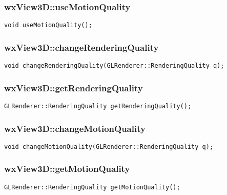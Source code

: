 \documentclass[12pt]{article}
\begin{document}
\subsubsection*{wxView3D::useMotionQuality}
\vspace{-0.65cm}
\hrulefill
{}
\begin{flushleft}
\texttt{void useMotionQuality();}
\end{flushleft}



\subsubsection*{wxView3D::changeRenderingQuality}
\vspace{-0.65cm}
\hrulefill
{}
\begin{flushleft}
\texttt{void changeRenderingQuality(GLRenderer::RenderingQuality q);}
\end{flushleft}



\subsubsection*{wxView3D::getRenderingQuality}
\vspace{-0.65cm}
\hrulefill
{}
\begin{flushleft}
\texttt{GLRenderer::RenderingQuality getRenderingQuality();}
\end{flushleft}



\subsubsection*{wxView3D::changeMotionQuality}
\vspace{-0.65cm}
\hrulefill
{}
\begin{flushleft}
\texttt{void changeMotionQuality(GLRenderer::RenderingQuality q);}
\end{flushleft}



\subsubsection*{wxView3D::getMotionQuality}
\vspace{-0.65cm}
\hrulefill
{}
\begin{flushleft}
\texttt{GLRenderer::RenderingQuality getMotionQuality();}
\end{flushleft}
\end{document}
